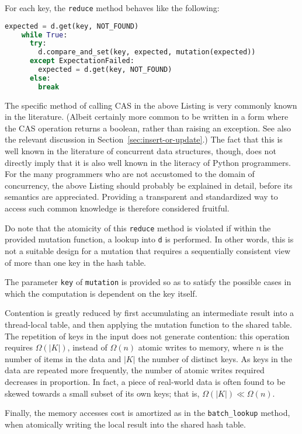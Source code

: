 For each key, the \texttt{reduce} method behaves like the following:
\begin{lstlisting}[capition={A common pattern when using CAS instructions.}, label={lst:aggregate}, language=Python]
    expected = d.get(key, NOT_FOUND)
    while True:
      try:
        d.compare_and_set(key, expected, mutation(expected))
      except ExpectationFailed:
        expected = d.get(key, NOT_FOUND)
      else:
        break
\end{lstlisting}

The specific method of calling CAS in the above Listing is very commonly known in the literature.
(Albeit certainly more common to be written in a form where the CAS operation returns a boolean, rather than raising an exception.
See also the relevant discussion in Section~\ref{sec:insert-or-update}.)
The fact that this is well known in the literature of concurrent data structures, though, does not directly imply that it is also well known in the literacy of Python programmers.
For the many programmers who are not accustomed to the domain of concurrency, the above Listing should probably be explained in detail, before its semantics are appreciated.
Providing a transparent and standardized way to access such common knowledge is therefore considered fruitful.

Do note that the atomicity of this \texttt{reduce} method is violated if within the provided mutation function, a lookup into \texttt{d} is performed.
In other words, this is not a suitable design for a mutation that requires a sequentially consistent view of more than one key in the hash table.

The parameter \texttt{key} of \texttt{mutation} is provided so as to satisfy the possible cases in which the computation is dependent on the key itself.

Contention is greatly reduced by first accumulating an intermediate result into a thread-local table, and then applying the mutation function to the shared table.
The repetition of keys in the input does not generate contention: this operation requires $\Omega(|K|)$, instead of $\Omega(n)$ atomic writes to memory, where $n$ is the number of items in the data and $|K|$ the number of distinct keys.
As keys in the data are repeated more frequently, the number of atomic writes required decreases in proportion.
In fact, a piece of real-world data is often found to be skewed towards a small subset of its own keys; that is, $\Omega(|K|) \ll \Omega(n)$.

Finally, the memory accesses cost is amortized as in the \texttt{{batch\_lookup}} method, when atomically writing the local result into the shared hash table.

